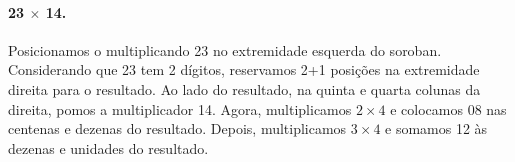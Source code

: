 \documentclass[12pt]{book}
\begin{document}
\vspace{0.25cm}
\begin{minipage}{0.4\textwidth}
\end{minipage}%
%
\begin{minipage}{0.3\textwidth}
\end{minipage}%
%
\begin{minipage}{0.3\textwidth}
\end{minipage}

\paragraph{23 $\times$ 14.}
Posicionamos o multiplicando 23 no extremidade
esquerda do soroban. Considerando que 23
tem 2 dígitos, reservamos 2+1 posições
na extremidade direita para o resultado.
Ao lado do resultado, na quinta e quarta colunas
da direita, pomos a multiplicador 14.
Agora, multiplicamos $2\times 4$ e colocamos
08 nas centenas e dezenas do resultado.
Depois,
multiplicamos $3\times 4$ e somamos 12 às
dezenas e unidades do resultado.\\
\end{document}
